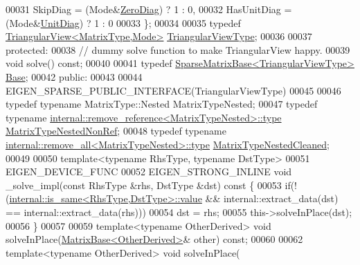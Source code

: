 \begin{DoxyCode}
00031            SkipDiag = (Mode&\hyperlink{group__enums_gga39e3366ff5554d731e7dc8bb642f83cda884ff7240392e85aa6e4b3c957e36483}{ZeroDiag}) ? 1 : 0,
00032            HasUnitDiag = (Mode&\hyperlink{group__enums_gga39e3366ff5554d731e7dc8bb642f83cdaddb72f888ac85d5a1c52333e54f9374b}{UnitDiag}) ? 1 : 0
00033     \};
00034     
00035     \textcolor{keyword}{typedef} \hyperlink{group___core___module_class_eigen_1_1_triangular_view}{TriangularView<MatrixType,Mode>} 
      \hyperlink{group___core___module_class_eigen_1_1_triangular_view}{TriangularViewType};
00036     
00037   \textcolor{keyword}{protected}:
00038     \textcolor{comment}{// dummy solve function to make TriangularView happy.}
00039     \textcolor{keywordtype}{void} solve() \textcolor{keyword}{const};
00040 
00041     \textcolor{keyword}{typedef} \hyperlink{group___sparse_core___module_class_eigen_1_1_sparse_matrix_base}{SparseMatrixBase<TriangularViewType>} 
      \hyperlink{group___sparse_core___module_class_eigen_1_1_sparse_matrix_base}{Base};
00042   \textcolor{keyword}{public}:
00043     
00044     EIGEN\_SPARSE\_PUBLIC\_INTERFACE(TriangularViewType)
00045     
00046     \textcolor{keyword}{typedef} \textcolor{keyword}{typename} MatrixType::Nested MatrixTypeNested;
00047     \textcolor{keyword}{typedef} \textcolor{keyword}{typename} \hyperlink{group___sparse_core___module}{internal::remove\_reference<MatrixTypeNested>::type}
       \hyperlink{group___sparse_core___module}{MatrixTypeNestedNonRef};
00048     \textcolor{keyword}{typedef} \textcolor{keyword}{typename} \hyperlink{group___sparse_core___module}{internal::remove\_all<MatrixTypeNested>::type}
       \hyperlink{group___sparse_core___module}{MatrixTypeNestedCleaned};
00049 
00050     \textcolor{keyword}{template}<\textcolor{keyword}{typename} RhsType, \textcolor{keyword}{typename} DstType>
00051     EIGEN\_DEVICE\_FUNC
00052     EIGEN\_STRONG\_INLINE \textcolor{keywordtype}{void} \_solve\_impl(\textcolor{keyword}{const} RhsType &rhs, DstType &dst)\textcolor{keyword}{ const }\{
00053       \textcolor{keywordflow}{if}(!(\hyperlink{struct_eigen_1_1internal_1_1is__same}{internal::is\_same<RhsType,DstType>::value} && 
      internal::extract\_data(dst) == internal::extract\_data(rhs)))
00054         dst = rhs;
00055       this->solveInPlace(dst);
00056     \}
00057 
00059     \textcolor{keyword}{template}<\textcolor{keyword}{typename} OtherDerived> \textcolor{keywordtype}{void} solveInPlace(\hyperlink{group___core___module_class_eigen_1_1_matrix_base}{MatrixBase<OtherDerived>}& 
      other) \textcolor{keyword}{const};
00060 
00062     \textcolor{keyword}{template}<\textcolor{keyword}{typename} OtherDerived> \textcolor{keywordtype}{void} solveInPlace(

\end{DoxyCode}
